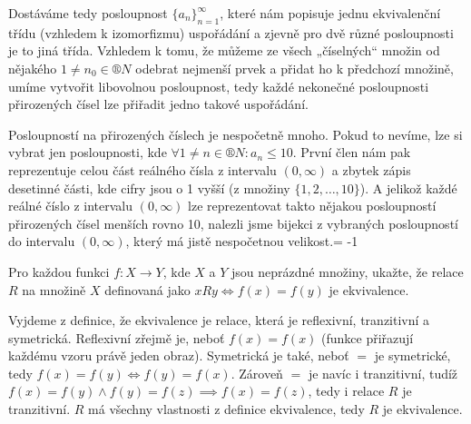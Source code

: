 \documentclass[12pt]{article}					%
\begin{document}
\begin{priklad}[1]
\begin{reseni}
        Dostáváme tedy posloupnost $\{a_n\}_{n=1}^∞$, které nám popisuje jednu ekvivalenční třídu (vzhledem k izomorfizmu) uspořádání a zjevně pro dvě různé posloupnosti je to jiná třída. Vzhledem k tomu, že můžeme ze všech „číselných“ množin od nějakého $1≠n_0 \in ®N$ odebrat nejmenší prvek a přidat ho k předchozí množině, umíme vytvořit libovolnou posloupnost, tedy každé nekonečné posloupnosti přirozených čísel lze přiřadit jedno takové uspořádání.

        Posloupností na přirozených číslech je nespočetně mnoho. Pokud to nevíme, lze si vybrat jen posloupnosti, kde $\forall 1≠n \in ®N: a_n≤10$. První člen nám pak reprezentuje celou část reálného čísla z intervalu $(0, ∞)$ a zbytek zápis desetinné části, kde cifry jsou o 1 vyšší (z množiny $\{1, 2, …, 10\}$). A jelikož každé reálné číslo z intervalu $(0, ∞)$ lze reprezentovat takto nějakou posloupností přirozených čísel menších rovno 10, nalezli jsme bijekci z vybraných posloupností do intervalu $(0, ∞)$, který má jistě nespočetnou velikost.\looseness = -1

    \end{reseni}

\end{priklad}

\pagebreak

\begin{priklad}[2]
    Pro každou funkci $f: X \rightarrow Y$, kde $X$ a $Y$ jsou neprázdné množiny, ukažte, že relace $R$ na množině $X$ definovaná jako $xRy \Leftrightarrow f(x) = f(y)$ je ekvivalence.

    \begin{reseni}
        Vyjdeme z definice, že ekvivalence je relace, která je reflexivní, tranzitivní a symetrická. Reflexivní zřejmě je, neboť $f(x) = f(x)$ (funkce přiřazují každému vzoru právě jeden obraz). Symetrická je také, neboť $=$ je symetrické, tedy $f(x) = f(y) \Leftrightarrow f(y) = f(x)$. Zároveň $=$ je navíc i tranzitivní, tudíž $f(x) = f(y) \land f(y) = f(z) \implies f(x) = f(z)$, tedy i relace $R$ je tranzitivní. $R$ má všechny vlastnosti z definice ekvivalence, tedy $R$ je ekvivalence.
    \end{reseni}
\end{priklad}

\pagebreak
\end{document}
